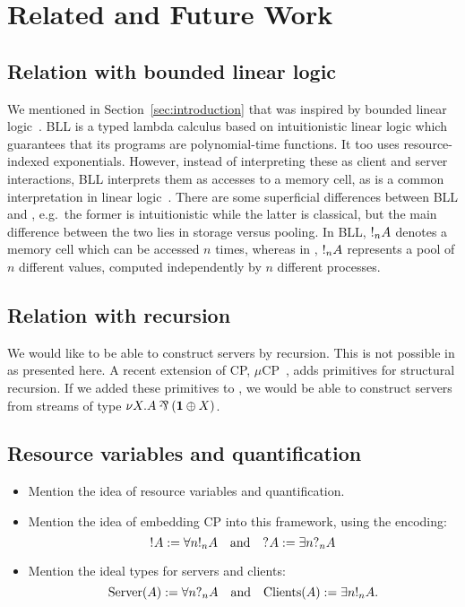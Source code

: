 \documentclass[a4paper,UKenglish]{lipics-v2016}
\begin{document}
\section{Related and Future Work}

\subsection*{Relation with bounded linear logic}
We mentioned in Section~\ref{sec:introduction} that \nodcap was inspired by
bounded linear logic~\cite[BLL]{girard1992}. BLL is a typed lambda calculus
based on intuitionistic linear logic which guarantees that its programs are
polynomial-time functions.
It too uses resource-indexed exponentials. However, instead of interpreting
these as client and server interactions, BLL interprets them as accesses to a
memory cell, as is a common interpretation in linear logic~\cite{girard1987}.
There are some superficial differences between BLL and \nodcap, e.g.\ the former
is intuitionistic while the latter is classical, but the main difference between
the two lies in storage versus pooling. In BLL, $\take[n]{A}$ denotes a memory
cell which can be accessed $n$ times, whereas in \nodcap, $\take[n]{A}$
represents a pool of $n$ different values, computed independently by $n$
different processes.

\subsection*{Relation with recursion}
We would like to be able to construct servers by recursion. This is not possible
in \nodcap as presented here.
A recent extension of CP, $\mu\text{CP}$~\cite{lindley2016}, adds primitives for
structural recursion.
If we added these primitives to \nodcap, we would be able to construct servers
from streams of type $\nu X.A \parr (\one \plus X)$.

\subsection*{ Resource variables and quantification}
\begin{itemize}
\item
  Mention the idea of resource variables and quantification.
\item
  Mention the idea of embedding CP into this framework, using the encoding:
  \[
    \take{A} := \forall{n}\take[n]{A}
    \quad\text{and}\quad
    \give{A} := \exists{n}{\give[n]{A}}
  \]
\item
  Mention the ideal types for servers and clients:
  \[
    \text{Server}(A) := \forall{n}\give[n]{A}
    \quad\text{and}\quad
    \text{Clients}(A) := \exists{n}{\take[n]{A}}.
  \]
\end{itemize}

\clearpage

\end{document}
